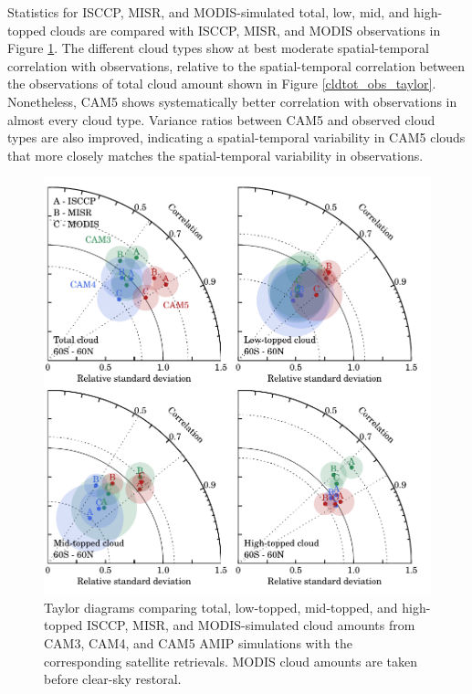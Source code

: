 Statistics for ISCCP, MISR, and MODIS-simulated total, low, mid, and high-topped clouds are compared with ISCCP, MISR, and MODIS observations in Figure \ref{cldtypes_camamip_taylor}. The different cloud types show at best moderate spatial-temporal correlation with observations, relative to the spatial-temporal correlation between the observations of total cloud amount shown in Figure \ref{cldtot_obs_taylor}. Nonetheless, CAM5 shows systematically better correlation with observations in almost every cloud type. Variance ratios between CAM5 and observed cloud types are also improved, indicating a spatial-temporal variability in CAM5 clouds that more closely matches the spatial-temporal variability in observations.
\begin{figure}
    \centering
    \includegraphics{../graphics/cldtypes_camamip_taylor.pdf}
    \caption[Taylor diagrams comparing total, low-topped, mid-topped, and high-topped ISCCP, MISR, and MODIS-simulated cloud amounts from CAM3, CAM4, and CAM5 AMIP simulations with the corresponding satellite retrievals.]{Taylor diagrams comparing total, low-topped, mid-topped, and high-topped ISCCP, MISR, and MODIS-simulated cloud amounts from CAM3, CAM4, and CAM5 AMIP simulations with the corresponding satellite retrievals. MODIS cloud amounts are taken before clear-sky restoral.}
    \label{cldtypes_camamip_taylor}
\end{figure}

